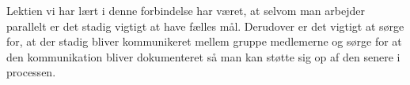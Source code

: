 Lektien vi har lært i denne forbindelse har været, at selvom man arbejder parallelt er det stadig vigtigt at have fælles mål. Derudover er det vigtigt at sørge for, at der stadig bliver kommunikeret mellem gruppe medlemerne og sørge for at den kommunikation bliver dokumenteret så man kan støtte sig op af den senere i processen.